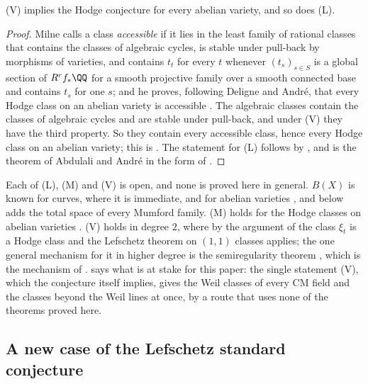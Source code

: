 \begin{theorem}\label{thm:vhcab}
\textup{(V)} implies the Hodge conjecture for every abelian variety, and so
does \textup{(L)}.
\end{theorem}

\begin{proof}
Milne calls a class \emph{accessible} if it lies in the least family of
rational classes that contains the classes of algebraic cycles, is stable
under pull-back by morphisms of varieties, and contains $t_{t}$ for every $t$
whenever $(t_{s})_{s\in S}$ is a global section of $R^{r}f_{*}\QQ$ for a
smooth projective family over a smooth connected base and contains $t_{s}$
for one $s$; and he proves, following Deligne and Andr\'e, that every Hodge
class on an abelian variety is accessible \cite[\S5.1, Theorem~3]{Mil20}.
The algebraic classes contain the classes of algebraic cycles and are stable
under pull-back, and under \textup{(V)} they have the third property. So they
contain every accessible class, hence every Hodge class on an abelian
variety; this is \cite[Remark~2]{Mil20}. The statement for \textup{(L)}
follows by , and is the theorem of Abdulali and Andr\'e in
the form of \cite[Theorem~4]{Mil20}.
\end{proof}

\begin{remark}\label{rem:lmvknown}
Each of \textup{(L)}, \textup{(M)} and \textup{(V)} is open, and none is
proved here in general. $B(X)$ is known for curves, where it is immediate,
and for abelian varieties \cite[\S2]{Kle68}, and 
below adds the total space of every Mumford family. \textup{(M)} holds for the Hodge
classes on abelian varieties \cite[Th\'eor\`eme~0.6.2]{And96b}.
\textup{(V)} holds in degree $2$, where by the argument of
 the class $\xi_{t}$ is a Hodge class and the Lefschetz
theorem on $(1,1)$ classes applies; the one general mechanism for it in
higher degree is the semiregularity theorem \cite{Blo72,BF03,Pri24}, which is the
mechanism of .  says what is at
stake for this paper: the single statement \textup{(V)}, which the conjecture
itself implies, gives the Weil classes of every CM field and the classes
beyond the Weil lines at once, by a route that uses none of the theorems
proved here.
\end{remark}

\subsection{A new case of the Lefschetz standard conjecture}
\label{ssec:newlefschetz}

